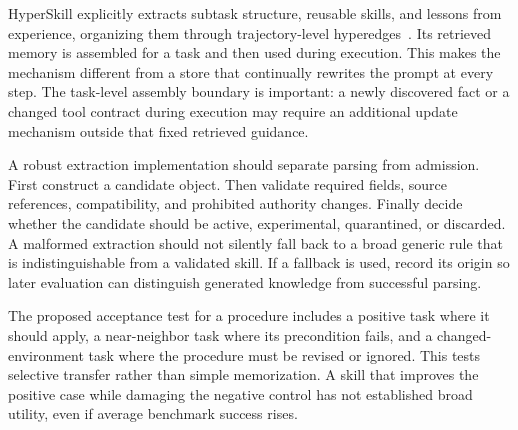 HyperSkill explicitly extracts subtask structure, reusable skills, and lessons from experience, organizing them through trajectory-level hyperedges~\cite{xu2026hyperskill}. Its retrieved memory is assembled for a task and then used during execution. This makes the mechanism different from a store that continually rewrites the prompt at every step. The task-level assembly boundary is important: a newly discovered fact or a changed tool contract during execution may require an additional update mechanism outside that fixed retrieved guidance.

A robust extraction implementation should separate parsing from admission. First construct a candidate object. Then validate required fields, source references, compatibility, and prohibited authority changes. Finally decide whether the candidate should be active, experimental, quarantined, or discarded. A malformed extraction should not silently fall back to a broad generic rule that is indistinguishable from a validated skill. If a fallback is used, record its origin so later evaluation can distinguish generated knowledge from successful parsing.

The proposed acceptance test for a procedure includes a positive task where it should apply, a near-neighbor task where its precondition fails, and a changed-environment task where the procedure must be revised or ignored. This tests selective transfer rather than simple memorization. A skill that improves the positive case while damaging the negative control has not established broad utility, even if average benchmark success rises.

